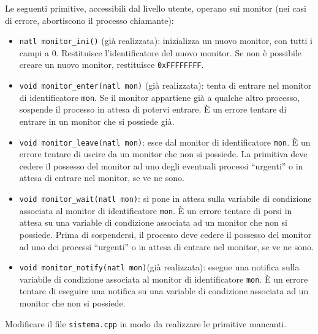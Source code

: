 Le seguenti primitive, accessibili dal livello utente, operano sui
monitor (nei casi di errore, abortiscono il processo chiamante):
\begin{itemize}
\item \verb|natl monitor_ini()| (gi\`a realizzata): inizializza un nuovo monitor, 
con tutti i campi a 0.  Restituisce l'identificatore del nuovo monitor. Se non
\`e possibile creare un nuovo monitor, restituisce {\tt 0xFFFFFFFF}.
\item \verb|void monitor_enter(natl mon)| (gi\`a realizzata): tenta di entrare nel monitor di identificatore
{\tt mon}.  Se il monitor appartiene gi\`a a qualche altro processo,
sospende il processo in attesa di potervi entrare.
\`E un errore tentare di entrare in un monitor che si possiede gi\`a. 
\item \verb|void monitor_leave(natl mon)|:
esce dal monitor di identificatore {\tt mon}.
\`E un errore tentare di uscire da un monitor che non si possiede.
La primitiva deve cedere il possesso del monitor ad uno degli eventuali
processi ``urgenti'' o in attesa di entrare nel monitor, se ve ne sono.
\item \verb|void monitor_wait(natl mon)|: si pone in
attesa sulla variabile di condizione associata al monitor di identificatore
{\tt mon}.  \`E un errore tentare di porsi in attesa su una variable di
condizione associata ad un monitor che non si possiede.
Prima di sospendersi, il processo deve cedere il possesso del monitor
ad uno dei processi ``urgenti'' o in attesa di entrare nel monitor, se ve ne sono.
\item \verb|void monitor_notify(natl mon)|(gi\`a realizzata):
esegue una notifica sulla
variabile di condizione associata al monitor di identificatore {\tt mon}.
\`E un errore tentare di eseguire una notifica su una variable di
condizione associata ad un monitor che non si possiede.
\end{itemize}

Modificare il file \verb|sistema.cpp| in modo da
realizzare le primitive mancanti.
